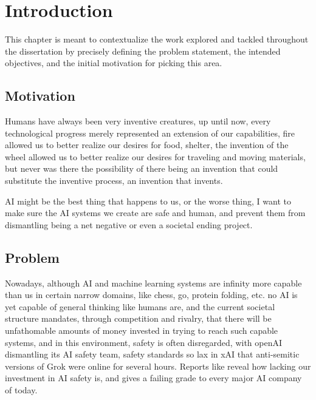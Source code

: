 \chapter{Introduction}\label{chap:introduction}

This chapter is meant to contextualize the work explored and tackled throughout the dissertation by precisely defining the problem statement, the intended objectives, and the initial motivation for picking this area.

\section{Motivation}

Humans have always been very inventive creatures, up until now, every technological progress merely represented an extension of our capabilities, fire allowed us to better realize our desires for food, shelter, the invention of the wheel allowed us to better realize our desires for traveling and moving materials, but never was there the possibility of there being an invention that could substitute the inventive process, an invention that invents. 

AI might be the best thing that happens to us, or the worse thing, I want to make sure the AI systems we create are safe and human, and prevent them from dismantling being a net negative or even a societal ending project.


\section{Problem}

Nowadays, although AI and machine learning systems are infinity more capable than us in certain narrow domains, like chess, go, protein folding, etc. no AI is yet capable of general thinking like humans are, and the current societal structure mandates, through competition and rivalry, that there will be unfathomable amounts of money invested in trying to reach such capable systems, and in this environment, safety is often disregarded, with openAI dismantling its AI safety team, safety standards so lax in xAI that anti-semitic versions of Grok were online for several hours. Reports like \cite{IAISafetyReport2025} reveal how lacking our investment in AI safety is, and \cite{FLIAISafetyIndex2025} gives a failing grade to every major AI company of today. 

